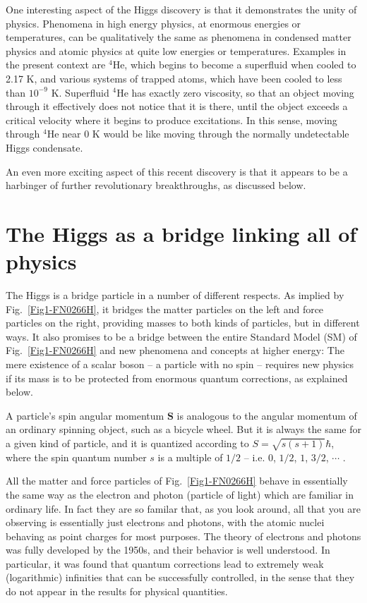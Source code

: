 \documentclass[12pt]{iopart}
\begin{document}
One interesting aspect of the Higgs discovery is that it demonstrates the unity of physics.  Phenomena in high energy physics, at enormous energies or temperatures, can be qualitatively the same as phenomena in condensed matter physics and atomic physics at quite low energies or temperatures. Examples in the present context are $^{4}$He, which begins to become a superfluid when cooled to 2.17 K, and various systems of trapped atoms, which have been cooled to less than $10^{-9}$ K. Superfluid $^{4}$He has exactly zero viscosity, so that an object moving through it effectively does not notice that it is there, until the object exceeds a critical velocity where it begins to produce excitations. In this sense, moving through $^{4}$He near 0 K would be like moving through the normally undetectable Higgs condensate.

An even more exciting aspect of this recent discovery is that it appears to be a harbinger of further revolutionary breakthroughs, as discussed below.

\section{\label{sec:sec2a} The Higgs as a bridge linking all of physics}

The Higgs is a bridge particle in a number of different respects. As implied by Fig.~\ref{Fig1-FN0266H}, it bridges the matter particles on the left and force particles on the right, providing masses to both kinds of particles, but in different ways. It also promises to be a bridge between the entire Standard Model (SM) of Fig.~\ref{Fig1-FN0266H} and new phenomena and concepts at higher energy: The mere existence of a scalar boson -- a particle with no spin -- requires new physics if its mass is to be protected from enormous quantum corrections, as explained below.

A particle's spin angular momentum $\mathbf{S}$ is analogous to the angular momentum of an ordinary spinning object, such as a bicycle wheel. But it is always the same for a given kind of particle, and it is quantized according to $S=\sqrt{s\left( s+1 \right)}\hbar$, where the spin quantum number $s$ is a multiple of $1/2$ -- i.e. $0$,  $1/2$, $1$, $3/2$, $\cdots$ .

All the matter and force particles of Fig.~\ref{Fig1-FN0266H} behave in essentially the same way as the electron and photon (particle of light) which are familiar in ordinary life. In fact they are so familar that, as you look around, all that you are observing is essentially just electrons and photons, with the atomic nuclei behaving as point charges for most purposes. The theory of electrons and photons was fully developed by the 1950s, and their behavior is well understood. In particular, it was found that quantum corrections lead to extremely weak (logarithmic) infinities that can be successfully controlled, in the sense that they do not appear in the results for physical quantities. 
\end{document}
